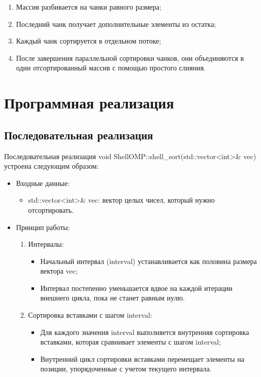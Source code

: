 \documentclass[]{article}
\theoremstyle{remark}
\theoremstyle{definition}
\newcommand{\cpp}{\textit{}}
\begin{document}
\begin{enumerate}
    \item Массив разбивается на чанки равного размера;
    \item Последний чанк получает дополнительные элементы из остатка;
    \item Каждый чанк сортируется в отдельном потоке;
    \item После завершения параллельной сортировки чанков, они объединяются в один отсортированный массив с помощью простого слияния.
\end{enumerate}

\newpage

\section{Программная реализация}

\subsection{Последовательная реализация}

\par Последовательная реализация \cpp{void ShellOMP::shell\_sort(std::vector<int>\& vec)} устроена следующим образом:

\begin{itemize}
    \item Входные данные:

    \begin{itemize}
        \item \cpp{std::vector<int>\& vec}: вектор целых чисел, который нужно отсортировать.
    \end{itemize}
    
    \item Принцип работы:
    \begin{enumerate}
        \item Интервалы:
        \begin{itemize}
            \item Начальный интервал (\cpp{interval}) устанавливается как половина размера вектора \cpp{vec};
            \item Интервал постепенно уменьшается вдвое на каждой итерации внешнего цикла, пока не станет равным нулю.
        \end{itemize}
        \item Сортировка вставками с шагом \cpp{interval}:
        \begin{itemize}
            \item Для каждого значения \cpp{interval} выполняется внутренняя сортировка вставками, которая сравнивает элементы с шагом \cpp{interval};
            \item Внутренний цикл сортировки вставками перемещает элементы на позиции, упорядоченные с учетом текущего интервала.
        \end{itemize}
    \end{enumerate}
\end{itemize}
\end{document}
